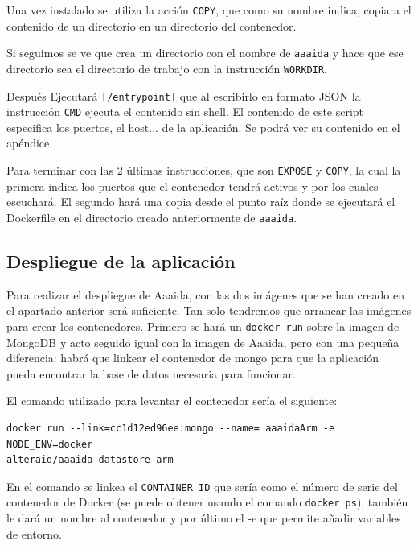 Una vez instalado se utiliza la acción \texttt{COPY}, que como su nombre indica, copiara el contenido de un directorio en un directorio del contenedor.

Si seguimos se ve que crea un directorio con el nombre de \texttt{aaaida} y hace que ese directorio sea el directorio de trabajo con la instrucción \texttt{WORKDIR}.
 
Después Ejecutará \texttt{[/entrypoint]} que al escribirlo en formato JSON la instrucción \texttt{CMD} ejecuta el contenido sin shell. El contenido de este script especifica los puertos, el host... de la aplicación. Se podrá ver su contenido en el apéndice.
 
Para terminar con las 2 últimas instrucciones, que son \texttt{EXPOSE} y \texttt{COPY}, la cual la primera indica los puertos que el contenedor tendrá activos y por los cuales escuchará. El segundo hará una copia desde el punto raíz donde se ejecutará el Dockerfile en el directorio creado anteriormente de \texttt{aaaida}.

\subsection{Despliegue de la aplicación} 

Para realizar el despliegue de Aaaida, con las dos imágenes que se han creado en el apartado anterior será suficiente. Tan solo tendremos que arrancar las imágenes para crear los contenedores. 
Primero se hará un \texttt{docker run} sobre la imagen de MongoDB y acto seguido igual con la imagen de Aaaida, pero con una pequeña diferencia: habrá que linkear el contenedor de mongo para que la aplicación pueda encontrar la base de datos necesaria para funcionar.

El comando utilizado para levantar el contenedor sería el siguiente:

\begin{center}
\begin{verbatim}
docker run --link=cc1d12ed96ee:mongo --name= aaaidaArm -e NODE_ENV=docker 
alteraid/aaaida datastore-arm
\end{verbatim}
\end{center}

En el comando se linkea el \texttt{CONTAINER ID} que sería como el número de serie del contenedor de Docker (se puede obtener usando el comando \texttt{docker ps}), también le dará un nombre al contenedor y por último el -e que permite añadir variables de entorno.
\newline 

